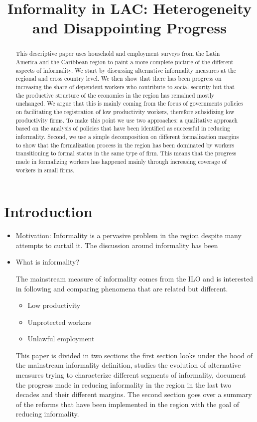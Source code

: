 \documentclass[english]{article}
\begin{document}
\title{Informality in LAC: Heterogeneity and Disappointing Progress}
\maketitle
\begin{abstract}
    This descriptive paper uses household and employment surveys from the Latin America and the Caribbean region to paint a more complete picture of the different aspects of informality. We start by discussing alternative informality measures at the regional and cross country level. We then show that there has been progress on increasing the share of dependent workers who contribute to social security but that the productive structure of the economies in the region has remained mostly unchanged. We argue that this is mainly coming from the focus of governments policies on facilitating the registration of low productivity workers, therefore subsidizing low productivity firms. To make this point we use two approaches: a qualitative approach based on the analysis of policies that have been identified as successful in reducing informality. Second, we use a simple decomposition on different formalization margins to show that the formalization process in the region has been dominated by workers transitioning to formal status in the same type of firm. This means that the progress made in formalizing workers has happened mainly through increasing coverage of workers in small firms. 
\end{abstract}
\section{Introduction}
\begin{itemize}
    \item Motivation: Informality is a pervasive problem in the region despite many attempts to curtail it. The discussion around informality has been     \item What is informality? 
    
    The mainstream measure of informality comes from the ILO and is interested in following and comparing phenomena that are related but different. 
    \begin{itemize}
        \item Low productivity
        \item Unprotected workers
        \item Unlawful employment
    \end{itemize}
   This paper is divided in two sections the first section looks under the hood of the mainstream informality definition, studies the evolution of alternative measures trying to characterize different segments of informality, document the progress made in reducing informality in the region in the last two decades and their different margins. The second section goes over a summary of the reforms that have been implemented in the region with the goal of reducing informality. 
\end{itemize}
\end{document}
